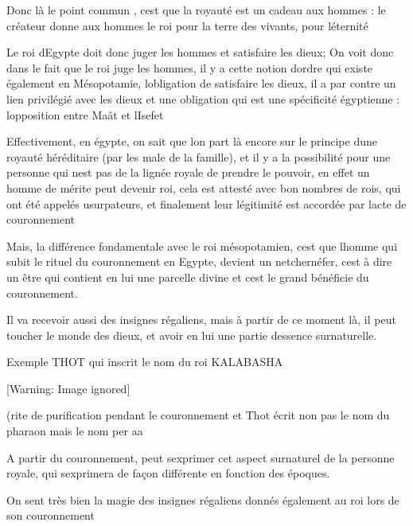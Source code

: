 \documentclass{article}
\begin{document}
Donc là le point commun , c{\textquotesingle}est que la royauté est un
cadeau aux hommes : le créateur donne aux hommes le roi pour la terre
des vivants, pour l{\textquotesingle}éternité

Le roi d{\textquotesingle}Egypte doit donc juger les hommes et
satisfaire les dieux; On voit donc dans le fait que le roi juge les
hommes, il y a cette notion d{\textquotesingle}ordre qui existe
également en Mésopotamie, l{\textquotesingle}obligation de satisfaire
les dieux,  il a par contre un lien privilégié avec les dieux et une
obligation qui est une spécificité égyptienne :
l{\textquotesingle}opposition entre Maât et l{\textquotesingle}Isefet

Effectivement, en égypte, on sait que l{\textquotesingle}on part là
encore sur le principe d{\textquotesingle}une royauté héréditaire (par
les male de la famille), et il y a la possibilité pour une personne qui
n{\textquotesingle}est pas de la lignée royale de prendre le pouvoir, 
en effet un homme de mérite peut devenir roi, cela est attesté avec bon
nombres de rois, qui ont été appelés usurpateurs, et finalement leur
légitimité est accordée par l{\textquotesingle}acte de couronnement

Mais, la différence fondamentale avec le roi mésopotamien,
c{\textquotesingle}est que l{\textquotesingle}homme qui subit le rituel
du couronnement en Egypte, devient un netchernéfer,
c{\textquotesingle}est à dire un  être qui contient en lui une parcelle
divine et c{\textquotesingle}est le grand bénéficie du couronnement.

Il va recevoir aussi des insignes régaliens, mais à partir de ce moment
là, il peut toucher le monde des dieux, et avoir en lui une partie
d{\textquotesingle}essence surnaturelle.

Exemple THOT qui inscrit le nom du roi KALABASHA

  [Warning: Image ignored] %
 

(rite de purification pendant le couronnement et Thot écrit non pas le
nom du pharaon mais le nom  per aa

A partir du couronnement, peut s{\textquotesingle}exprimer cet aspect
surnaturel de la personne royale, qui s{\textquotesingle}exprimera de
façon différente en fonction des époques. 

On sent très bien la magie des insignes régaliens donnés également au
roi lors de son couronnement
\end{document}
